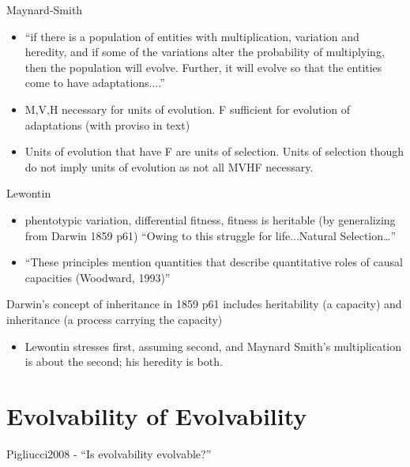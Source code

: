 	Maynard-Smith
	\begin{itemize}
		\item
		
		``if there is a population of entities with multiplication,
		variation and heredity, and if some of the variations alter the
		probability of multiplying, then the population will evolve.
		Further, it will evolve so that the entities come to have
		adaptations....''
		
		\item
		
		M,V,H necessary for units of evolution. F sufficient for evolution
		of adaptations (with proviso in text)
		
		\item
		
		Units of evolution that have F are units of selection. Units of
		selection though do not imply units of evolution as not all MVHF
		necessary.
		
	\end{itemize}
	
	Lewontin
	\begin{itemize}
		\item
		
		phentotypic variation, differential fitness, fitness is heritable
		(by generalizing from Darwin 1859 p61) ``Owing to this struggle for
		life...Natural Selection\ldots{}''
		
		\item
		
		``These principles mention quantities that describe quantitative
		roles of causal capacities (Woodward, 1993)''
		
	\end{itemize}
	
	Darwin's concept of inheritance in 1859 p61 includes heritability (a
	capacity) and inheritance (a process carrying the capacity)
	
	\begin{itemize}
		\item	
		Lewontin stresses first, assuming second, and Maynard Smith's
		multiplication is about the second; his heredity is both.
		
	\end{itemize}

\section{Evolvability of Evolvability}

Pigliucci2008 - ``Is evolvability evolvable?''

